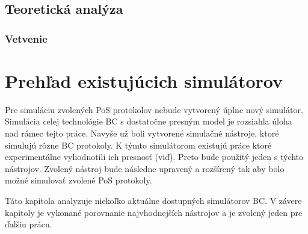 \section{Teoretická analýza}

\subsection{Vetvenie}

\chapter{Prehľad existujúcich simulátorov}

Pre simuláciu zvolených PoS protokolov nebude vytvorený úplne nový simulátor. Simulácia celej technológie BC s dostatočne presným model je rozsiahla úloha nad rámec tejto práce. Navyše už boli vytvorené simulačné nástroje, ktoré simulujú rôzne BC protokoly. K týmto simulátorom existujú práce ktoré experimentálne vyhodnotili ich presnosť (viď\cite{simulatorCompar, fanPerfEval}). Preto bude použitý jeden s týchto nástrojov. Zvolený nástroj bude následne upravený a rozšírený tak aby bolo možné simulovať zvolené PoS protokoly. 

Táto kapitola analyzuje niekoľko aktuálne dostupných simulátorov BC. V závere kapitoly je vykonané porovnanie najvhodnejších nástrojov a je zvolený jeden pre ďalšiu prácu.


